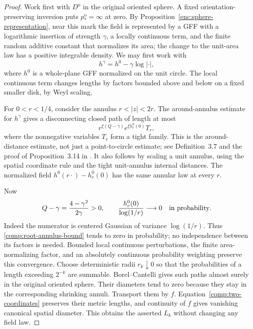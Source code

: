 \documentclass[11pt]{article}
\numberwithin{equation}{section}
\theoremstyle{definition}
\theoremstyle{remark}
\newcommand{\1}{\mathbf 1}
\begin{document}
\begin{proof}
Work first with $D^{\mathrm o}$ in the original oriented sphere.
A fixed orientation-preserving inversion puts
$p_*^{\mathrm o}=\infty$ at zero.  By
Proposition~\ref{enc:sphere-representation}, near this mark the field
is represented by a GFF with a logarithmic insertion of strength
$\gamma$, a locally continuous term, and the finite random additive
constant that normalizes its area; the change to the unit-area law
has a positive integrable density.  We may first work with
\[
 h^\gamma=h^0-\gamma\log|\cdot|,
\]
where $h^0$ is a whole-plane GFF normalized on the unit circle.
The local continuous term changes lengths by factors bounded above
and below on a fixed smaller disk, by Weyl scaling.

For $0<r<1/4$, consider the annulus $r<|z|<2r$.  The
around-annulus estimate for $h^\gamma$ gives a disconnecting closed
path of length at most
\begin{equation}
 \label{comp:root-annulus-bound}
 r^{\xi(Q-\gamma)}e^{\xi h^0_r(0)}T_r,
\end{equation}
where the nonnegative variables $T_r$ form a tight family.  This is
the around-distance estimate, not just a point-to-circle estimate;
see Definition~3.7 and the proof of Proposition~3.14 in
\cite{DubedatEtAlWeakMetric}.  It also follows by scaling a unit annulus, using
the spatial coordinate rule and the tight unit-annulus internal
distances.  The normalized field
$h^0(r\cdot)-h^0_r(0)$ has the same annular law at every $r$.

Now
\[
 Q-\gamma=\frac{4-\gamma^2}{2\gamma}>0,
 \qquad
 \frac{h^0_r(0)}{\log(1/r)}\longrightarrow0
 \quad\hbox{in probability}.
\]
Indeed the numerator is centered Gaussian of variance
$\log(1/r)$.  Thus \eqref{comp:root-annulus-bound} tends to zero in
probability; no independence between its factors is needed.  Bounded
local continuous perturbations, the finite area-normalizing factor,
and an absolutely continuous probability weighting preserve this
convergence.  Choose deterministic radii $r_k\downarrow0$ so that
the probabilities of a length exceeding $2^{-k}$ are summable.
Borel--Cantelli gives such paths almost surely in the original
oriented sphere.  Their diameters tend to zero because they stay
in the corresponding shrinking annuli.  Transport them by $f$.
Equation~\eqref{comp:two-coordinates} preserves their metric lengths,
and continuity of $f$ gives vanishing canonical spatial diameter.
This obtains the asserted $L_k$ without changing any field law.


\end{proof}
\end{document}
